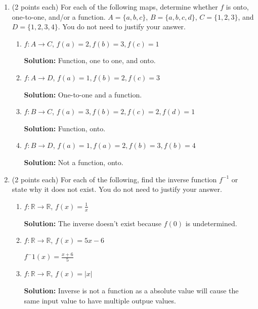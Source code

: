 \documentclass[11pt]{article}
\newcommand{\pte}[1]{\textcolor{maincolor}{(#1 points each)}}
\begin{document}
\begin{justify}
\begin{enumerate}
\begin{mdframed}
\begin{align*}
        2) &\text{Because $j \in \mathbb{Z}$, $\mathbb{Z} \subseteq \{5a + 6b \,|\, a,b \in \mathbb{Z}\}$} \tag{2. def of subset with (1)} \\
    \end{align*}
    Because both sets are subsets of each other, they are equivalent and thus we have directly proven that \{$5a + 6b$ | $a,b \in \mathbb{Z}$\} $ = \mathbb{Z}$.
\end{mdframed}
\item \pte{2} For each of the following maps, determine whether $f$ is onto,
one-to-one, and/or a function. $A = \{a, b, c\}$, $B = \{a, b, c, d\}$, $C = \{1,
2, 3\}$, and $D = \{1, 2, 3, 4\}$. You do not need to justify your answer.
\begin{enumerate}
\item $f: A \to C$, $f(a) = 2, f(b) = 3, f(c) = 1$
\begin{mdframed}
    \textbf{Solution:} Function, one to one, and onto.
\end{mdframed}
\item $f: A \to D$, $f(a) = 1, f(b) = 2, f(c) = 3$
\begin{mdframed}
    \textbf{Solution:} One-to-one and a function.
\end{mdframed}
\item $f: B \to C$, $f(a) = 3, f(b) = 2, f(c) = 2, f(d) = 1$
\begin{mdframed}
    \textbf{Solution:} Function, onto.
\end{mdframed}
\item $f: B \to D$, $f(a) = 1, f(a) = 2, f(b) = 3, f(b) = 4$
\begin{mdframed}
    \textbf{Solution:} Not a function, onto.
\end{mdframed}
\end{enumerate}
\item \pte{2} For each of the following, find the inverse function $f^{-1}$ or
state why it does not exist. You do not need to justify your answer.
\begin{enumerate}
\item $f: \mathbb{R} \to \mathbb{R}$, $f(x) = \frac{1}{x}$
\begin{mdframed}
    \textbf{Solution:} The inverse doesn't exist because $f(0)$ is undetermined.
\end{mdframed}
\item $f: \mathbb{R} \to \mathbb{R}$, $f(x) = 5x - 6$
\begin{mdframed}
    $f^-1(x) = \frac{x+6}{5}$
\end{mdframed}
\item $f: \mathbb{R} \to \mathbb{R}$, $f(x) = |x|$
\begin{mdframed}
    \textbf{Solution: }Inverse is not a function as a absolute value will cause the same input value to have multiple outpue values.
\end{mdframed}
\end{enumerate}
\end{enumerate}
\end{justify}
\end{document}
